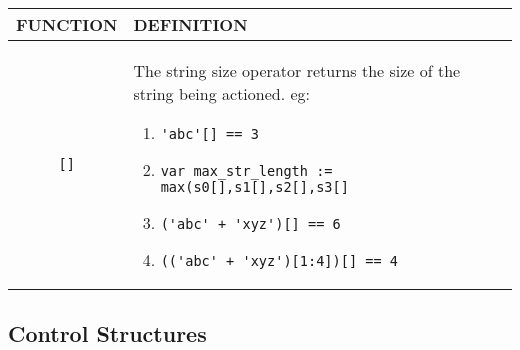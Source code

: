 \begin{tabular}{|c|p{}|}
\hline
FUNCTION& DEFINITION\\
  \hline
\verb'[]'& The string size operator returns the size of the string 
 being actioned. eg:
\begin{enumerate}
\item\verb"'abc'[] == 3"
\item\verb"var max_str_length := max(s0[],s1[],s2[],s3[]"
\item\verb"('abc' + 'xyz')[] == 6"
\item\verb"(('abc' + 'xyz')[1:4])[] == 4"
\end{enumerate}\\
  \hline
\end{tabular}

\subsection{Control Structures}
